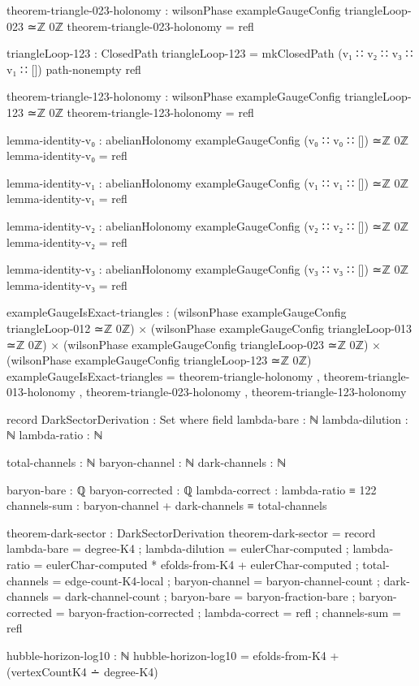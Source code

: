 \documentclass[11pt,a4paper]{book}
\begin{document}
\begin{code}
theorem-triangle-023-holonomy : wilsonPhase exampleGaugeConfig triangleLoop-023 ≃ℤ 0ℤ
theorem-triangle-023-holonomy = refl

triangleLoop-123 : ClosedPath
triangleLoop-123 = mkClosedPath 
  (v₁ ∷ v₂ ∷ v₃ ∷ v₁ ∷ [])
  path-nonempty
  refl

theorem-triangle-123-holonomy : wilsonPhase exampleGaugeConfig triangleLoop-123 ≃ℤ 0ℤ
theorem-triangle-123-holonomy = refl

lemma-identity-v₀ : abelianHolonomy exampleGaugeConfig (v₀ ∷ v₀ ∷ []) ≃ℤ 0ℤ
lemma-identity-v₀ = refl

lemma-identity-v₁ : abelianHolonomy exampleGaugeConfig (v₁ ∷ v₁ ∷ []) ≃ℤ 0ℤ
lemma-identity-v₁ = refl

lemma-identity-v₂ : abelianHolonomy exampleGaugeConfig (v₂ ∷ v₂ ∷ []) ≃ℤ 0ℤ
lemma-identity-v₂ = refl

lemma-identity-v₃ : abelianHolonomy exampleGaugeConfig (v₃ ∷ v₃ ∷ []) ≃ℤ 0ℤ
lemma-identity-v₃ = refl

exampleGaugeIsExact-triangles : 
  (wilsonPhase exampleGaugeConfig triangleLoop-012 ≃ℤ 0ℤ) ×
  (wilsonPhase exampleGaugeConfig triangleLoop-013 ≃ℤ 0ℤ) ×
  (wilsonPhase exampleGaugeConfig triangleLoop-023 ≃ℤ 0ℤ) ×
  (wilsonPhase exampleGaugeConfig triangleLoop-123 ≃ℤ 0ℤ)
exampleGaugeIsExact-triangles = 
  theorem-triangle-holonomy , 
  theorem-triangle-013-holonomy , 
  theorem-triangle-023-holonomy , 
  theorem-triangle-123-holonomy

record DarkSectorDerivation : Set where
  field
    lambda-bare : ℕ
    lambda-dilution : ℕ
    lambda-ratio : ℕ
    
    total-channels : ℕ
    baryon-channel : ℕ
    dark-channels : ℕ
    
    baryon-bare : ℚ
    baryon-corrected : ℚ
    lambda-correct : lambda-ratio ≡ 122
    channels-sum : baryon-channel + dark-channels ≡ total-channels

theorem-dark-sector : DarkSectorDerivation
theorem-dark-sector = record
  { lambda-bare = degree-K4
  ; lambda-dilution = eulerChar-computed
  ; lambda-ratio = eulerChar-computed * efolds-from-K4 + eulerChar-computed
  ; total-channels = edge-count-K4-local
  ; baryon-channel = baryon-channel-count
  ; dark-channels = dark-channel-count
  ; baryon-bare = baryon-fraction-bare
  ; baryon-corrected = baryon-fraction-corrected
  ; lambda-correct = refl
  ; channels-sum = refl
  }

hubble-horizon-log10 : ℕ
hubble-horizon-log10 = efolds-from-K4 + (vertexCountK4 ∸ degree-K4)


\end{code}
\end{document}
